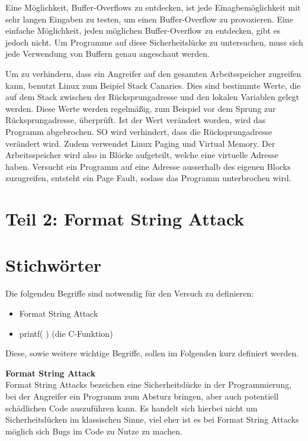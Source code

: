\documentclass[12pt,a4paper]{article}
\begin{document}
	Eine Möglichkeit, Buffer-Overflows zu entdecken, ist jede Einagbemöglichkeit mit sehr 
	langen Eingaben zu testen, um einen Buffer-Overflow zu provozieren.
	Eine einfache Möglichkeit, jeden möglichen Buffer-Overflow zu entdecken, gibt es jedoch nicht. 
	Um Programme auf diese Sicherheitslücke zu untersuchen, muss sich jede Verwendung von Buffern 
	genau angeschaut werden. 
	\bigskip
	
	Um zu verhindern, dass ein Angreifer auf den gesamten Arbeitsspeicher zugreifen kann, benutzt 
	Linux zum Beipiel Stack Canaries. Dies sind bestimmte Werte, die auf dem Stack zwischen 
	der Rücksprungadresse und den lokalen Variablen gelegt werden. Diese Werte werden regelmäßig, 
	zum Beispiel vor dem Sprung zur Rücksprungadresse, überprüft. Ist der Wert verändert worden, 
	wird das Programm abgebrochen. SO wird verhindert, dass die Rücksprungadresse verändert wird. 
	Zudem verwendet Linux Paging und Virtual Memory. Der Arbeitsspeicher wird also in Blöcke 
	aufgeteilt, welche eine virtuelle Adresse haben. Versucht ein Programm auf eine Adresse 
	ausserhalb des eigenen Blocks zuzugreifen, entsteht ein Page Fault, sodass das Programm 
	unterbrochen wird. 
	\bigskip


\section*{Teil 2: Format String Attack}
	
	
	\section*{Stichwörter}
	Die folgenden Begriffe sind notwendig für den Versuch zu definieren:
	\begin{itemize}
		\item Format String Attack
		\item printf( ) (die C-Funktion)
	\end{itemize}
	
	Diese, sowie weitere wichtige Begriffe, sollen im Folgenden kurz definiert werden.
	\bigskip
	
	\textbf{Format String Attack} \\
	Format String Attacks bezeichen eine Sicherheitslücke in der Programmierung, bei der Angreifer ein Programm zum Absturz bringen, aber auch potentiell schädlichen Code auszuführen kann.
	Es handelt sich hierbei nicht um Sicherheitslücken im klassischen Sinne, viel eher ist es bei Format String Attacks möglich sich Bugs im Code zu Nutze zu machen.
	\bigskip
	
\end{document}
